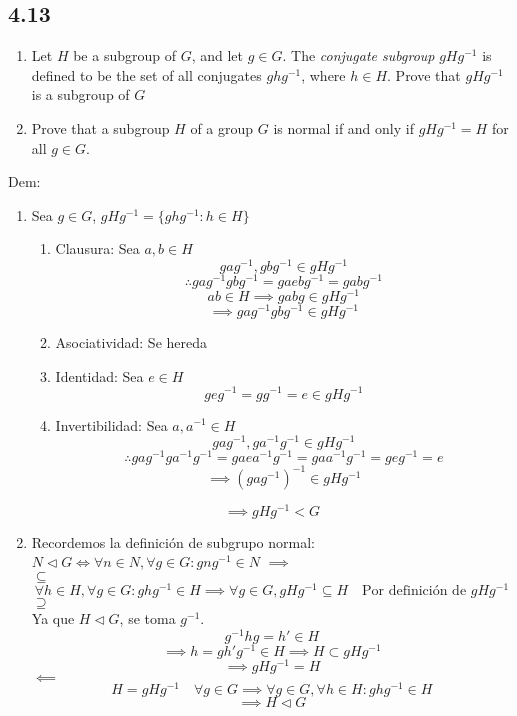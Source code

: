 \documentclass[11pt]{article}
\begin{document}
\subsection*{4.13}
\begin{enumerate}[label=(\alph*)]
	\item Let $H$ be a subgroup of $G$, and let $g\in G$. The \textit{conjugate subgroup} $gHg^{-1}$ is defined to be the set of all conjugates $ghg^{-1}$, where $h\in H$. Prove that $gHg^{-1}$ is a subgroup of $G$
	
	\item Prove that a subgroup $H$ of a group $G$ is normal if and only if $gHg^{-1}=H$ for all $g\in G$.
\end{enumerate}
Dem:
\begin{enumerate}[label=(\alph*)]
	\item Sea $g\in G$, $gHg^{-1}=\{ghg^{-1}:h\in H\}$
	\begin{enumerate}[label=\arabic*.]
		\item Clausura: Sea $a,b\in H$
		\[
		gag^{-1},gbg^{-1}\in gHg^{-1}
		\]
		\[
		\therefore gag^{-1}gbg^{-1}=gaebg^{-1}=gabg^{-1}
		\]
		\[
		ab\in H\implies gabg\in gHg^{-1}
		\]
		\[
		\implies gag^{-1}gbg^{-1}\in gHg^{-1}
		\]
		
		\item Asociatividad: Se hereda
		
		\item Identidad: Sea $e\in H$
		\[
		geg^{-1}=gg^{-1}=e\in gHg^{-1}
		\]
		
		\item Invertibilidad: Sea $a,a^{-1}\in H$
		\[
		gag^{-1},ga^{-1}g^{-1}\in gHg^{-1}
		\]
		\[
		\therefore gag^{-1}ga^{-1}g^{-1}=gaea^{-1}g^{-1}=gaa^{-1}g^{-1}=geg^{-1}=e
		\]
		\[
		\implies (gag^{-1})^{-1}\in gHg^{-1}
		\] 
	\end{enumerate}
	
	\[
	\implies gHg^{-1}< G
	\]
	
	\item Recordemos la definición de subgrupo normal: $N\lhd G\iff\forall n \in N,\forall g\in G: gng^{-1}\in N$
	$\implies$\\
	$\subseteq$
	\[
	\forall h \in H,\forall g\in G: ghg^{-1}\in H\implies \forall g\in G, gHg^{-1}\subseteq H\quad\textrm{Por definición de $gHg^{-1}$}
	\]
	$\supseteq$\\
	Ya que $H\lhd G$, se toma $g^{-1}$.
	\[
	g^{-1}hg=h'\in H
	\]
	\[
	\implies h=gh'g^{-1}\in H\implies H\subset gHg^{-1}
	\]
	\[
	\implies gHg^{-1}=H
	\]
	$\impliedby$
	\[
	 H=gHg^{-1}\quad \forall g\in G\implies \forall g\in G,\forall h\in H:ghg^{-1}\in H
	\]
	\[
	\implies H\lhd G
	\]
\end{enumerate}
\end{document}
